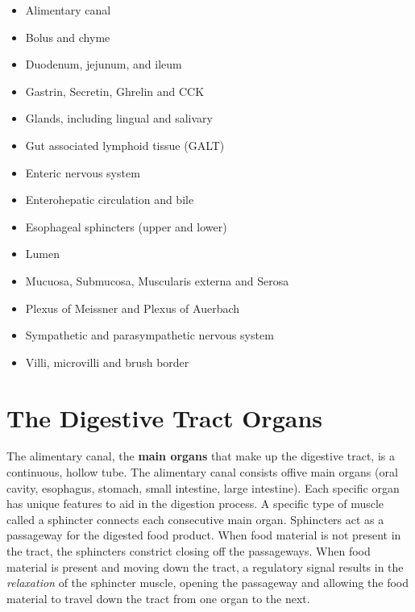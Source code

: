 \documentclass{tufte-handout}
\begin{document}
\begin{itemize}
\item Alimentary canal
\item Bolus and chyme
\item Duodenum, jejunum, and ileum
\item Gastrin, Secretin, Ghrelin and CCK
\item Glands, including lingual and salivary
\item Gut associated lymphoid tissue (GALT)
\item Enteric nervous system 
\item Enterohepatic circulation and bile
\item Esophageal sphincters (upper and lower)
\item Lumen
\item Mucuosa, Submucosa, Muscularis externa and Serosa
\item Plexus of Meissner and Plexus of Auerbach
\item Sympathetic and parasympathetic nervous system
\item Villi, microvilli and brush border

\end{itemize}

\section{The Digestive Tract Organs}

The alimentary canal, the \textbf{main organs} that make up the digestive tract, is a continuous, hollow tube. The alimentary canal consists offive main organs (oral cavity, esophagus, stomach, small intestine, large intestine). Each specific organ has unique features to aid in the digestion process. A specific type of muscle called a sphincter connects each consecutive main organ. Sphincters act as a passageway for the digested food product. When food material is not present in the tract, the sphincters constrict closing off the passageways. When food material is present and moving down the tract, a regulatory signal results in the \emph{relaxation} of the sphincter muscle, opening the passageway and allowing the food material to travel down the tract from one organ to the next. 
\end{document}
